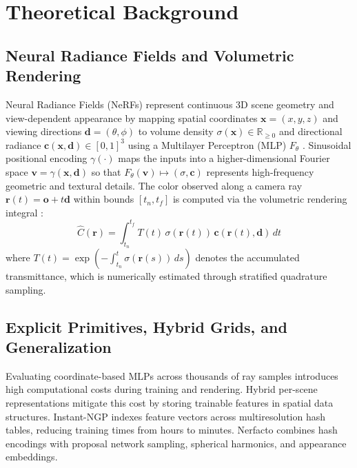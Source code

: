 \section{Theoretical Background}
\label{sec:fund}

\subsection{Neural Radiance Fields and Volumetric Rendering}
Neural Radiance Fields (NeRFs) represent continuous 3D scene geometry and view-dependent appearance by mapping spatial coordinates $\mathbf{x} = (x, y, z)$ and viewing directions $\mathbf{d} = (\theta, \phi)$ to volume density $\sigma(\mathbf{x}) \in \mathbb{R}_{\ge 0}$ and directional radiance $\mathbf{c}(\mathbf{x}, \mathbf{d}) \in [0, 1]^3$ using a Multilayer Perceptron (MLP) $F_\theta$ \cite{mildenhall2020nerfrepresentingscenesneural}. Sinusoidal positional encoding $\gamma(\cdot)$ maps the inputs into a higher-dimensional Fourier space $\mathbf{v} = \gamma(\mathbf{x}, \mathbf{d})$ so that $F_\theta(\mathbf{v}) \mapsto (\sigma, \mathbf{c})$ represents high-frequency geometric and textural details. The color observed along a camera ray $\mathbf{r}(t) = \mathbf{o} + t\mathbf{d}$ within bounds $[t_n, t_f]$ is computed via the volumetric rendering integral \cite{mildenhall2020nerfrepresentingscenesneural}:
\begin{equation}
\hat{C}(\mathbf{r}) = \int_{t_n}^{t_f} T(t)\,\sigma(\mathbf{r}(t))\,\mathbf{c}(\mathbf{r}(t), \mathbf{d}) \, dt
\label{eq:vol_render}
\end{equation}
where $T(t) = \exp\!\left(-\int_{t_n}^t \sigma(\mathbf{r}(s)) \, ds\right)$ denotes the accumulated transmittance, which is numerically estimated through stratified quadrature sampling.

\subsection{Explicit Primitives, Hybrid Grids, and Generalization}
Evaluating coordinate-based MLPs across thousands of ray samples introduces high computational costs during training and rendering. Hybrid per-scene representations mitigate this cost by storing trainable features in spatial data structures. Instant-NGP \cite{muller2022} indexes feature vectors across multiresolution hash tables, reducing training times from hours to minutes. Nerfacto \cite{Tancik2023} combines hash encodings with proposal network sampling, spherical harmonics, and appearance embeddings.

